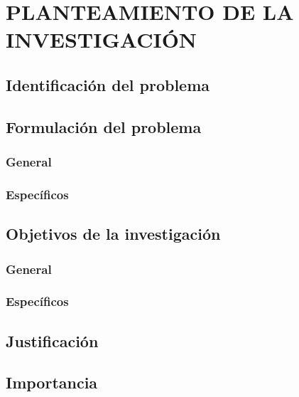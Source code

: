 \documentclass[12pt,a4paper,oneside]{report}
\begin{document}

\chapter{PLANTEAMIENTO DE LA INVESTIGACIÓN}

\section{Identificación del problema}

\section{Formulación del problema}

\subsection{General}

\subsection{Específicos}

\section{Objetivos de la investigación}

\subsection{General}

\subsection{Específicos}

\section{Justificación}

\section{Importancia}


\end{document}
